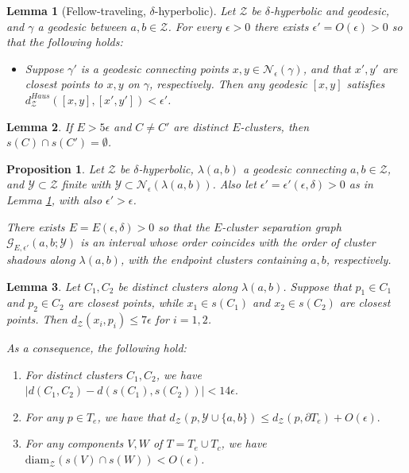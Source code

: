 \documentclass[10pt,a4paper]{amsart}
\newtheorem{lemma}{Lemma}
\newtheorem{proposition}{Proposition}
\newcommand{\calG}{\mathcal{G}}
\newcommand{\calN}{\mathcal{N}}
\newcommand{\calY}{\mathcal{Y}}
\newcommand{\calZ}{\mathcal{Z}}
\newcommand{\diam}{\mathrm{diam}}
\begin{document}
\begin{lemma}[Fellow-traveling, $\delta$-hyperbolic]\label{lem:Morse close}
Let $\calZ$ be $\delta$-hyperbolic and geodesic, and $\gamma$ a geodesic between $a,b \in \calZ$.  For every $\epsilon>0$ there exists $\epsilon'=O(\epsilon)>0$ so that the following holds:

\begin{itemize}
\item Suppose $\gamma'$ is a geodesic connecting points $x,y \in \calN_{\epsilon}(\gamma)$, and that $x',y'$ are closest points to $x,y$ on $\gamma$, respectively.  Then any geodesic $[x,y]$ satisfies $d_{\calZ}^{Haus}([x,y], [x',y']) < \epsilon'$.
\end{itemize}
\end{lemma}

\begin{lemma} \label{lem:cluster arrangement}
If $E > 5\epsilon$ and $C \neq C'$ are distinct $E$-clusters, then $s(C) \cap s(C') = \emptyset$.
\end{lemma}

\begin{proposition}\label{prop:cluster sep graph}
Let $\calZ$ be $\delta$-hyperbolic, $\lambda(a,b)$ a geodesic connecting $a,b \in \calZ$, and $\calY \subset \calZ$ finite with $\calY \subset \calN_{\epsilon}(\lambda(a,b))$.  Also let $\epsilon' = \epsilon'(\epsilon, \delta)>0$ as in Lemma \ref{lem:Morse close}, with also $\epsilon' > \epsilon$.

There exists $E = E(\epsilon, \delta)>0$ so that the $E$-cluster separation graph $\calG_{E,\epsilon'}(a,b;\calY)$ is an interval whose order coincides with the order of cluster shadows along $\lambda(a,b)$, with the endpoint clusters containing $a,b$, respectively. 
\end{proposition}

\begin{lemma}\label{lem:cluster close}
Let $C_1, C_2$ be distinct clusters along $\lambda(a,b)$.  Suppose that $p_1 \in C_1$ and $p_2 \in C_2$ are closest points, while $x_1 \in s(C_1)$ and $x_2 \in s(C_2)$ are closest points.  Then $d_{\calZ}(x_i, p_i) \leq 7\epsilon$ for $i=1,2$.

As a consequence, the following hold:
\begin{enumerate}
\item For distinct clusters $C_1,C_2$, we have $|d(C_1,C_2) - d(s(C_1),s(C_2))| < 14\epsilon.$
\item For any $p \in T_e$, we have that $d_{\calZ}(p, \calY \cup \{a,b\}) \leq d_{\calZ}(p, \partial T_e) + O(\epsilon).$
\item For any components $V,W$ of $T = T_e \cup T_c$, we have $\diam_{\calZ}(s(V)\cap s(W)) < O(\epsilon)$.
\end{enumerate}
\end{lemma}
\end{document}
